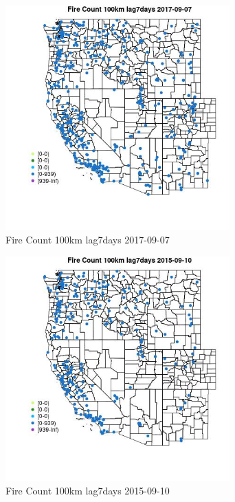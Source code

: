 \begin{figure} 
\centering  
\includegraphics[width=0.77\textwidth]{Code_Outputs/Report_ML_input_PM25_Step4_part_e_de_duplicated_aves_compiled_2019-05-20wNAs_MapObsFire_Count_100km_lag7days2017-09-07.jpg} 
\caption{\label{fig:Report_ML_input_PM25_Step4_part_e_de_duplicated_aves_compiled_2019-05-20wNAsMapObsFire_Count_100km_lag7days2017-09-07}Fire Count 100km lag7days 2017-09-07} 
\end{figure} 
 

\begin{figure} 
\centering  
\includegraphics[width=0.77\textwidth]{Code_Outputs/Report_ML_input_PM25_Step4_part_e_de_duplicated_aves_compiled_2019-05-20wNAs_MapObsFire_Count_100km_lag7days2015-09-10.jpg} 
\caption{\label{fig:Report_ML_input_PM25_Step4_part_e_de_duplicated_aves_compiled_2019-05-20wNAsMapObsFire_Count_100km_lag7days2015-09-10}Fire Count 100km lag7days 2015-09-10} 
\end{figure} 
 

